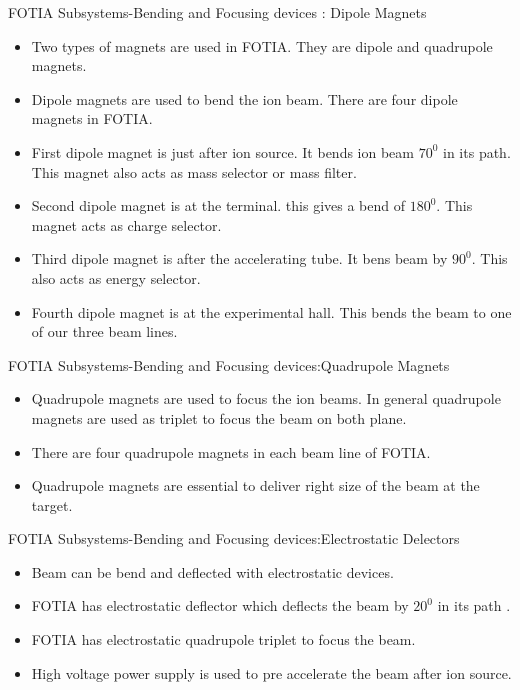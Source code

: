 \documentclass[11pt]{beamer}
\begin{document}
\begin{frame}{FOTIA Subsystems-Bending and Focusing devices : Dipole Magnets}

  \begin{itemize}
   
    \item Two types of magnets are used in FOTIA. They are dipole and quadrupole magnets.
    \item Dipole magnets are used to bend the ion beam. There are four dipole magnets in FOTIA.
    \item First dipole magnet is just after ion source. It bends ion beam $70^0$ in its path. This magnet also acts as mass selector or mass filter.
    \item Second dipole magnet is at the terminal. this gives a bend of $180^0$. This magnet acts as charge selector.
    \item Third dipole magnet is after the accelerating tube. It bens beam by $90^0$. This also acts as energy selector.
    \item Fourth dipole magnet is at the experimental hall. This bends the beam to one of our three beam lines.
   
   \end{itemize}

\end{frame}

\begin{frame}{FOTIA Subsystems-Bending and Focusing devices:Quadrupole Magnets}

  \begin{itemize}
   
   
    \item Quadrupole magnets are used to focus the ion beams. In general quadrupole magnets are used as triplet to focus the beam on both plane.
    \item There are four quadrupole magnets in each beam line of FOTIA.
    
    \item Quadrupole magnets are essential to deliver right size of the beam at the target.   
   \end{itemize}

\end{frame}

\begin{frame}{FOTIA Subsystems-Bending and Focusing devices:Electrostatic Delectors}

  \begin{itemize}
   
   
    \item Beam can be bend and deflected with electrostatic devices.
    \item FOTIA has electrostatic deflector which deflects the beam by $20^0$ in its path .
    \item FOTIA has electrostatic quadrupole triplet to focus the beam.
    \item High voltage power supply is used to pre accelerate the beam after ion source.
    
      
   \end{itemize}

\end{frame}
\end{document}
